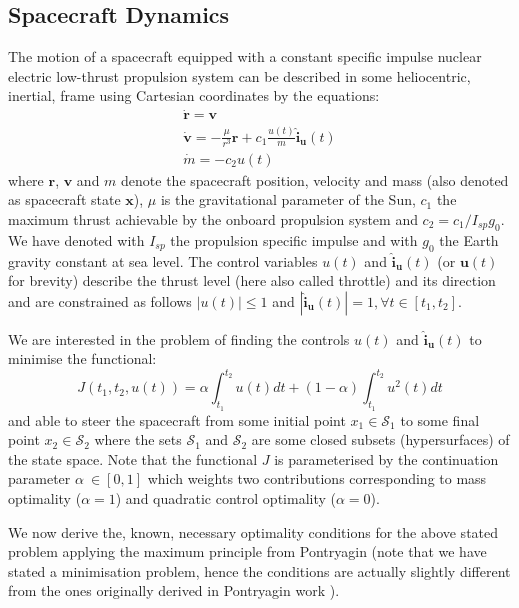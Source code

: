 \documentclass[graybox]{svmult}
\begin{document}
\subsection {Spacecraft Dynamics}
The motion of a spacecraft equipped with a constant specific impulse nuclear electric low-thrust propulsion system can be described in some heliocentric, inertial, frame using Cartesian coordinates by the equations:
\begin{equation}\label{eq:eom}
\begin{array}{l}
    \dot {\mathbf r} = \mathbf v\\
    \dot {\mathbf v} = -\frac{\mu}{r^3}\mathbf r + c_1 \frac {u(t)}m \mathbf{\hat i_u} (t) \\
    \dot m = - c_2 u(t)
\end{array}
\end{equation}
where $\mathbf r$, $\mathbf v$ and $m$ denote the spacecraft position, velocity and mass (also denoted as spacecraft state $\mathbf x$), $\mu$ is the gravitational parameter of the Sun, $c_1$ the maximum thrust achievable by the onboard propulsion system and $c_2 = c_1 / I_{sp} g_0$. We have denoted with $I_{sp}$ the propulsion specific impulse and with $g_0$ the Earth gravity constant at sea level. The control variables $u(t)$ and $\mathbf{\hat i_u}(t)$ (or $\mathbf u(t)$ for brevity) describe the thrust level (here also called throttle) and its direction and are constrained as follows $|u(t)| \le 1$ and $|\mathbf{\hat i_u}(t)| = 1, \forall t \in [t_1, t_2]$.

We are interested in the problem of finding the controls $u(t)$ and $\mathbf{\hat i_u}(t)$ to minimise the functional:
\begin{equation}\label{eq:J}
J(t_1, t_2, u(t)) = \alpha \int_{t_1}^{t_2} u(t) dt + (1 - \alpha) \int_{t_1}^{t_2} u^2(t) dt
\end{equation}
and able to steer the spacecraft from some initial point $x_1 \in \mathcal S_1$ to some final point $x_2 \in \mathcal S_2$ where the sets $\mathcal S_1$ and $\mathcal S_2$ are some closed subsets (hypersurfaces) of the state space. Note that the functional $J$ is parameterised by the continuation parameter $\alpha \ \in [0,1]$ which weights two contributions corresponding to mass optimality ($\alpha = 1$) and quadratic control optimality ($\alpha = 0 $). 

We now derive the, known, necessary optimality conditions for the above stated problem applying the maximum principle from Pontryagin (note that we have stated a minimisation problem, hence the conditions are actually slightly different from the ones originally derived in Pontryagin work \cite{pontryagin}).
\end{document}
